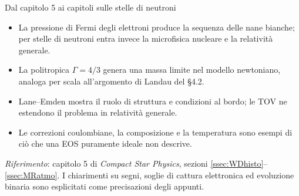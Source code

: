 \begin{frame}[t]{Dal capitolo 5 ai capitoli sulle stelle di neutroni}
\small
\begin{itemize}
\item La pressione di Fermi degli elettroni produce la sequenza delle nane bianche; per stelle di neutroni entra invece la microfisica nucleare e la relatività generale.
\item La politropica $\Gamma=4/3$ genera una massa limite nel modello newtoniano, analoga per scala all'argomento di Landau del §4.2.
\item Lane--Emden mostra il ruolo di struttura e condizioni al bordo; le TOV ne estendono il problema in relatività generale.
\item Le correzioni coulombiane, la composizione e la temperatura sono esempi di ciò che una EOS puramente ideale non descrive.
\end{itemize}
\medskip
\emph{Riferimento}: capitolo 5 di \emph{Compact Star Physics}, sezioni \ref{ssec:WDhisto}--\ref{ssec:MRatmo}. I chiarimenti su segni, soglie di cattura elettronica ed evoluzione binaria sono esplicitati come precisazioni degli appunti.
\end{frame}

